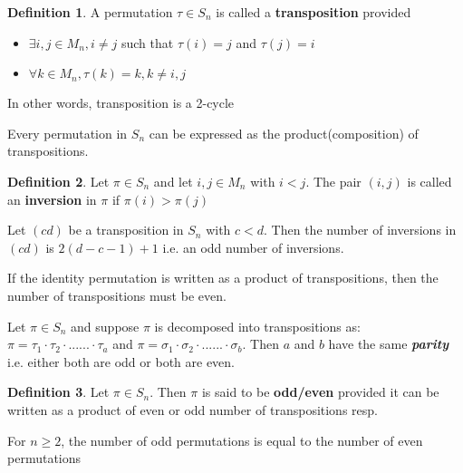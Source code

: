 \documentclass{article}
\theoremstyle{definition}
\newtheorem*{defi}{Definition}
\theoremstyle{definition}
\newenvironment{manualprop}[1]{%
  \renewcommand\themanualpropinner{#1}%
  \manualpropinner
}{\endmanualpropinner}
\newenvironment{manuallemma}[1]{%
  \renewcommand\themanuallemmainner{#1}%
  \manuallemmainner
}{\endmanuallemmainner}
\theoremstyle{named}
\begin{document}
\begin{defi}
A permutation $\tau \in S_n$ is called a \textbf{transposition} provided 
\begin{itemize}
    \item $\exists i, j \in M_n, i \neq j$ such that $\tau(i) = j$ and $\tau(j) = i$ 
    \item $\forall k \in M_n, \tau(k) = k, k \neq i,j$
\end{itemize}
In other words, transposition is a 2-cycle 
\end{defi}

\begin{manualprop}{19}
Every permutation in $S_n$ can be expressed as the product(composition) of transpositions. 
\end{manualprop}



\begin{defi}
Let $\pi \in S_n$ and let $i, j \in M_n$ with $i < j$. The pair $(i,j)$ is called an \textbf{inversion} in $\pi$ if $\pi(i) > \pi(j)$
\end{defi}


\begin{manuallemma}{20.1}[\textcolor{red}{important}]
Let $(cd)$ be a transposition in $S_n$ with $c<d$. Then the number of inversions in $(cd)$ is $2(d-c-1) + 1$ i.e. an odd number of inversions.
\end{manuallemma}

\begin{manuallemma}{20.2}[\textcolor{red}{important}]
If the identity permutation is written as a product of transpositions, then the number of transpositions must be even.
\end{manuallemma}

\begin{manualprop}{20}[\textcolor{red}{important}]
    Let $\pi \in S_n$ and suppose $\pi$ is decomposed into transpositions as: $\pi = \tau_1 \cdot \tau_2 \cdot ...... \cdot \tau_a$ and $\pi = \sigma_1 \cdot \sigma_2 \cdot ...... \cdot \sigma_b$. Then $a$ and $b$ have the same \textbf{\emph{parity}} i.e. either both are odd or both are even.
\end{manualprop}

\begin{defi}
Let $\pi \in S_n$. Then $\pi$ is said to be \textbf{odd/even} provided it can be written as a product of even or odd number of transpositions resp. 
\end{defi}

\begin{manualprop}{21}
    For $n\geq 2$, the number of odd permutations is equal to the number of even permutations
\end{manualprop}
\end{document}
